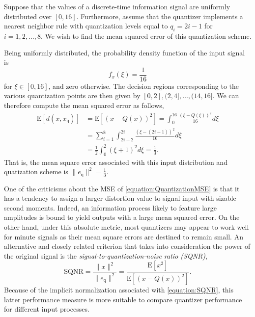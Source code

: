 \begin{example} \label{example:UniformQuantizer}
Suppose that the values of a discrete-time information signal are uniformly distributed over $[0,16]$.
Furthermore, assume that the quantizer implements a nearest neighbor rule with quantization levels equal to $q_i = 2i - 1$ for $i = 1, 2, \ldots, 8$.
We wish to find the mean squared error of this quantization scheme.

Being uniformly distributed, the probability density function of the input signal is
\begin{equation*}
f_x (\xi) = \frac{1}{16}
\end{equation*}
for $\xi \in [0, 16]$, and zero otherwise.
The decision regions corresponding to the various quantization points are then given by $[0, 2], (2, 4], \ldots, (14, 16]$.
We can therefore compute the mean squared error as follows,
\begin{equation*}
\begin{split}
\mathrm{E} [ d(x, x_{\mathrm{q}}) ]
&= \mathrm{E} [(x - Q(x))^2 ]
= \int_0^{16} \frac{(\xi - Q(\xi))^2}{16} d\xi \\
&= \sum_{i=1}^8 \int_{2i-2}^{2i} \frac{(\xi - (2i - 1))^2}{16} d\xi \\
&= \frac{1}{2} \int_{0}^{2} (\xi + 1)^2 d\xi = \frac{1}{3} .
\end{split}
\end{equation*}
That is, the mean square error associated with this input distribution and quatization scheme is $\| e_{\mathrm{q}} \|^2 = \frac{1}{3}$.
\end{example}

One of the criticisms about the MSE of \eqref{equation:QuantizationMSE} is that it has a tendency to assign a larger distortion value to signal input with sizable second moments.
Indeed, an information process likely to feature large amplitudes is bound to yield outputs with a large mean squared error.
On the other hand, under this absolute metric, most quantizers may appear to work well for minute signals as their mean square errors are destined to remain small.
An alternative and closely related criterion that takes into consideration the power of the original signal is the \emph{signal-to-quantization-noise ratio (SQNR)},
\begin{equation} \label{equation:SQNR}
\text{SQNR} = \frac{\| x \|^2}{\| e_{\mathrm{q}} \|^2}
= \frac{\mathrm{E} [ x^2 ]}{\mathrm{E} [(x - Q(x))^2 ]} .
\end{equation}
Because of the implicit normalization associated with \eqref{equation:SQNR}, this latter performance measure is more suitable to compare quantizer performance for different input processes.

